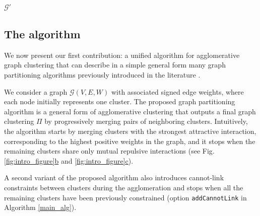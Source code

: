 \begin{algorithm}
\begin{algorithmic}[1]
      \State
      \State
      \Return $\mathcal{G}'$



  \end{algorithmic}
  \label{main_alg}
\end{algorithm}


\subsection{The algorithm}

We now present our first contribution: a unified algorithm for agglomerative graph clustering that can describe in a simple general form many graph partitioning algorithms previously introduced in the literature .

We consider a graph $\mathcal{G}(V,E,W)$ with associated signed edge weights, where each node initially represents one cluster.
The proposed graph partitioning algorithm is a general form of agglomerative clustering that outputs a final graph clustering $\Pi$ by progressively merging pairs of neighboring clusters. Intuitively, the algorithm starts by merging clusters with the strongest attractive interaction, corresponding to the highest positive weights in the graph, and it stops when the remaining clusters share only mutual repulsive interactions (see Fig. \hyperref[fig:intro_figure]{\ref*{fig:intro_figure}b} and \hyperref[fig:intro_figure]{\ref*{fig:intro_figure}c}). 

A second variant of the proposed algorithm also introduces cannot-link constraints between clusters during the agglomeration and stops when all the remaining clusters have been previously constrained (option \texttt{addCannotLink} in Algorithm \ref{main_alg}).


